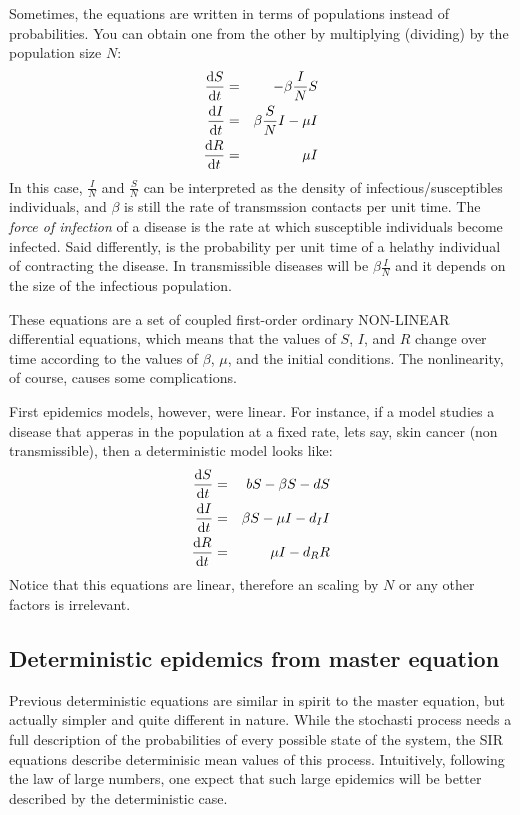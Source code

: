 Sometimes, the equations are written in terms of populations instead of probabilities. You can obtain one from the other by multiplying (dividing) by the population size $N$:
\begin{eqnarray}
\frac{\mathrm{d} S}{\mathrm{d} t} &=& -\beta \frac I N S   \nonumber \\
\frac{\mathrm{d} I}{\mathrm{d} t} &=& \beta \frac S N I - \mu I  \label{eq:SIR} \\
\frac{\mathrm{d} R}{\mathrm{d} t} &=& \mu I \nonumber
\end{eqnarray}
In this case, $\frac  I N$ and $\frac S N$ can be interpreted as the density of infectious/susceptibles individuals, and $\beta$ is still the rate of transmssion contacts per unit time. The {\it force of infection} of a disease is the rate at which susceptible individuals become infected. Said differently, is the probability per unit time of a helathy individual of contracting the disease. In transmissible diseases will be $\beta \frac I N$ and it depends on the size of the infectious population.

These equations are a set of coupled first-order ordinary NON-LINEAR differential equations, which means that the values of $S$, $I$, and $R$ change over time according to the values of $\beta$, $\mu$, and the initial conditions. The nonlinearity, of course, causes some complications.

First epidemics models, however, were linear. For instance, if a model studies a disease that apperas in the population at a fixed rate, lets say, skin cancer (non transmissible), then a deterministic model looks like:
\begin{eqnarray}
 \frac{\mathrm{d} S}{\mathrm{d} t} &=& b S -\beta S -d S  \nonumber \\
\frac{\mathrm{d} I}{\mathrm{d} t} &=& \beta S - \mu I  -d_I I\label{eq:SIRlinear} \\
\frac{\mathrm{d} R}{\mathrm{d} t} &=& \mu I - d_R R \nonumber
\end{eqnarray}
Notice that this equations are linear, therefore an scaling by $N$ or any other factors is irrelevant.



\subsection{Deterministic epidemics from master equation}

Previous deterministic equations are similar in spirit to the master equation, but actually simpler and quite different in nature. While the stochasti process needs a full description of the probabilities of every possible state of the system, the SIR equations describe determinisic mean values of this process. Intuitively, following the law of large numbers, one expect that such large epidemics will be better described by the deterministic case.

